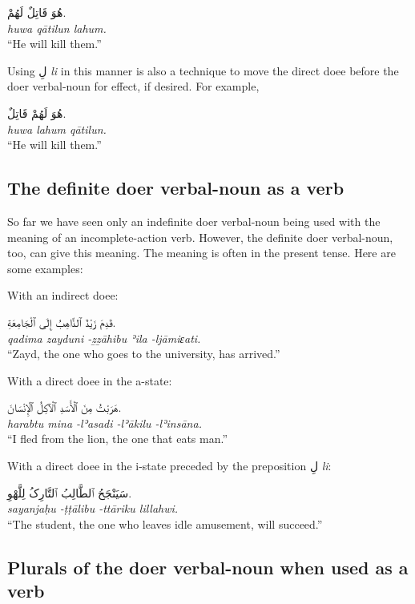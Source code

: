 \documentclass[
  10pt,
]{book}
\begin{document}
\begin{enumerate}
  \foreignlanguage{arabic}{هُوَ قَاتِلٌ لَهُمْ.}\\
  \emph{huwa qātilun lahum.}\\
  \enquote{He will kill them.}

  Using \foreignlanguage{arabic}{لِ} \emph{li} in this manner is also a technique to move the direct doee before the doer verbal-noun for effect, if desired. For example,

  \foreignlanguage{arabic}{هُوَ لَهُمْ قَاتِلٌ.}\\
  \emph{huwa lahum qātilun.}\\
  \enquote{He will kill them.}
\end{enumerate}

\subsection{The definite doer verbal-noun as a verb}\label{the-definite-doer-verbal-noun-as-a-verb}

So far we have seen only an indefinite doer verbal-noun being used with the meaning of an incomplete-action verb. However, the definite doer verbal-noun, too, can give this meaning. The meaning is often in the present tense. Here are some examples:

With an indirect doee:

\foreignlanguage{arabic}{قَدِمَ زَيْدٌ ٱلذَّاهِبُ إِلَى ٱلْجَامِعَةِ.}\\
\emph{qadima zayduni -ẕẕāhibu ʾila -ljāmiɛati.}\\
\enquote{Zayd, the one who goes to the university, has arrived.}

With a direct doee in the a-state:

\foreignlanguage{arabic}{هَرَبْتُ مِنَ ٱلْأَسَدِ ٱلْآکِلُ ٱلْإِنْسَانَ.}\\
\emph{harabtu mina -lʾasadi -lʾākilu -lʾinsāna.}\\
\enquote{I fled from the lion, the one that eats man.}

With a direct doee in the i-state preceded by the preposition \foreignlanguage{arabic}{لِ} \emph{li}:

\foreignlanguage{arabic}{سَيَنْجَحُ ٱلطَّالِبُ ٱلتَّارِکُ لِلَّهْوِ.}\\
\emph{sayanjaḥu -ṭṭālibu -ttāriku lillahwi.}\\
\enquote{The student, the one who leaves idle amusement, will succeed.}

\subsection{Plurals of the doer verbal-noun when used as a verb}\label{plurals-of-the-doer-verbal-noun-when-used-as-a-verb}
\end{document}
